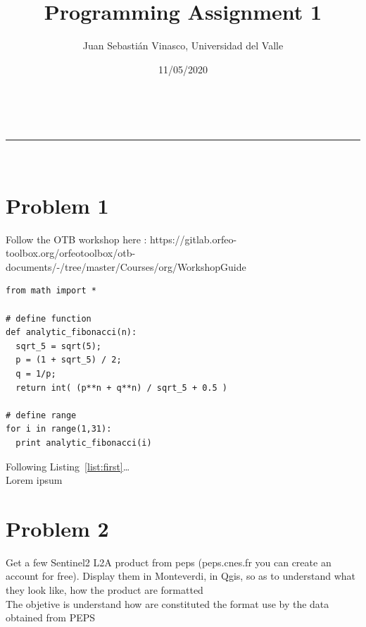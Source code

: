 \documentclass[a4paper,11pt]{article}
\makeatletter
\newcommand{\linia}{\rule{\linewidth}{0.5pt}}
\theoremstyle{mytheor}
\renewcommand{\maketitle}{
\begin{center}
\vspace{2ex}
{\huge \textsc{\@title}}
\vspace{1ex}
\\
\linia\\
\@author \hfill \@date
\vspace{4ex}
\end{center}
}
\makeatother
\begin{document}
\title{Programming Assignment \textnumero{} 1}

\author{Juan Sebasti\'an Vinasco, Universidad del Valle}

\date{11/05/2020}

\maketitle

\section*{Problem 1}

 Follow the OTB workshop here : https://gitlab.orfeo-toolbox.org/orfeotoolbox/otb-documents/-/tree/master/Courses/org/WorkshopGuide \\ 

\begin{lstlisting}[label={list:first},caption=Sample Python code -- Fibonacci sequence calculated analytically.]
from math import *

# define function 
def analytic_fibonacci(n):
  sqrt_5 = sqrt(5);
  p = (1 + sqrt_5) / 2;
  q = 1/p;
  return int( (p**n + q**n) / sqrt_5 + 0.5 )
 
# define range
for i in range(1,31):
  print analytic_fibonacci(i)
\end{lstlisting}

Following Listing~\ref{list:first}\ldots{}  \\
Lorem ipsum  \\

\section*{Problem 2}

Get a few Sentinel2 L2A product from peps (peps.cnes.fr you can create an account for free). Display them in Monteverdi, in Qgis, so as to understand what they look like, how the product are formatted \\



The objetive is understand how are constituted the format use by the data obtained from PEPS\\
\end{document}
